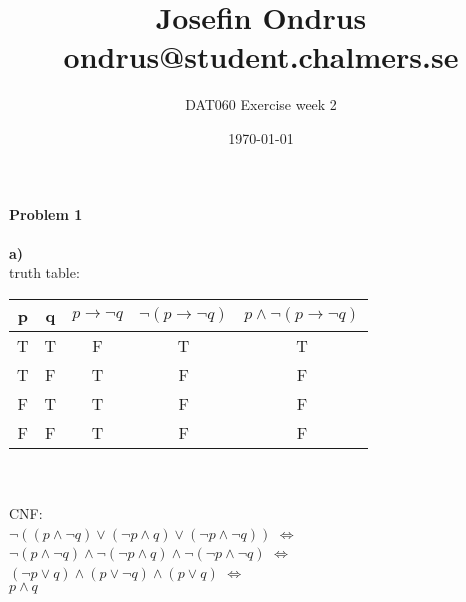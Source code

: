\documentclass[12pt,oneside,reqno]{amsart}
\begin{document}
\setlength{\parindent}{6pt}
\def\code#1{\texttt{#1}} %
\def\ra{\rightarrow{}} %
\newcommand{\itab}[1]{\hspace{0em}\rlap{#1}}
\newcommand{\tab}[1]{\hspace{.2\textwidth}\rlap{#1}}
\raggedbottom

\title{Josefin Ondrus\\ondrus@student.chalmers.se}
\author{DAT060 Exercise week 2}
\date{\today}
\maketitle

\textbf{Problem 1}\\\\
\textbf{a)}\\
truth table:\\
	\begin{tabular}{ cc|c|c|c }
		p & q & $p \ra \neg q$ & $\neg(p \ra \neg q)$ & $p \land \neg(p \ra \neg q)$ \\ \hline
		T & T & F & T & T \\
		T & F & T & F & F \\
		F & T & T & F & F \\
		F & F & T & F & F \\
	\end{tabular}\\\\
CNF:\\
$\neg((p \land \neg q) \lor (\neg p \land q) \lor (\neg p \land \neg q))$
$\Leftrightarrow$\\
$\neg(p \land \neg q) \land \neg(\neg p \land q) \land \neg(\neg p \land \neg q)$
$\Leftrightarrow$\\
$(\neg p \lor q) \land (p \lor \neg q) \land (p \lor q)$
$\Leftrightarrow$\\
$p \land q$ \\\\
\end{document}
